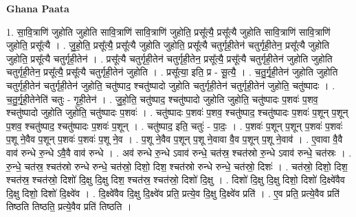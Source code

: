 \documentclass[17pt]{extarticle}
\begin{document}
\textbf{Ghana Paata } \newline

1. सा॒वि॒त्राणि॑ जुहोति जुहोति सावि॒त्राणि॑ सावि॒त्राणि॑ जुहोति॒ प्रसू᳚त्यै॒ प्रसू᳚त्यै जुहोति सावि॒त्राणि॑ सावि॒त्राणि॑ जुहोति॒ प्रसू᳚त्यै । . जु॒हो॒ति॒ प्रसू᳚त्यै॒ प्रसू᳚त्यै जुहोति जुहोति॒ प्रसू᳚त्यै चतुर्गृही॒तेन॑ चतुर्गृही॒तेन॒ प्रसू᳚त्यै जुहोति जुहोति॒ प्रसू᳚त्यै चतुर्गृही॒तेन॑ । . प्रसू᳚त्यै चतुर्गृही॒तेन॑ चतुर्गृही॒तेन॒ प्रसू᳚त्यै॒ प्रसू᳚त्यै चतुर्गृही॒तेन॑ जुहोति जुहोति चतुर्गृही॒तेन॒ प्रसू᳚त्यै॒ प्रसू᳚त्यै चतुर्गृही॒तेन॑ जुहोति । . प्रसू᳚त्या॒ इति॒ प्र - सू॒त्यै॒ । . च॒तु॒र्गृ॒ही॒तेन॑ जुहोति जुहोति चतुर्गृही॒तेन॑ चतुर्गृही॒तेन॑ जुहोति॒ चतु॑ष्पाद॒ श्चतु॑ष्पादो जुहोति चतुर्गृही॒तेन॑ चतुर्गृही॒तेन॑ जुहोति॒ चतु॑ष्पादः । . च॒तु॒र्गृ॒ही॒तेनेति॑ चतुः - गृ॒ही॒तेन॑ । . जु॒हो॒ति॒ चतु॑ष्पाद॒ श्चतु॑ष्पादो जुहोति जुहोति॒ चतु॑ष्पादः प॒शवः॑ प॒शव॒ श्चतु॑ष्पादो जुहोति जुहोति॒ चतु॑ष्पादः प॒शवः॑ । . चतु॑ष्पादः प॒शवः॑ प॒शव॒ श्चतु॑ष्पाद॒ श्चतु॑ष्पादः प॒शवः॑ प॒शून् प॒शून् प॒शव॒ श्चतु॑ष्पाद॒ श्चतु॑ष्पादः प॒शवः॑ प॒शून् । . चतु॑ष्पाद॒ इति॒ चतुः॑ - पा॒दः॒ । . प॒शवः॑ प॒शून् प॒शून् प॒शवः॑ प॒शवः॑ प॒शू ने॒वैव प॒शून् प॒शवः॑ प॒शवः॑ प॒शू ने॒व । . प॒शू ने॒वैव प॒शून् प॒शू ने॒वावा वै॒व प॒शून् प॒शू ने॒वाव॑ । . ए॒वावा वै॒वै वाव॑ रुन्धे रु॒न्धे ऽवै॒वै वाव॑ रुन्धे । . अव॑ रुन्धे रु॒न्धे ऽवाव॑ रुन्धे॒ चत॑स्र॒ श्चत॑स्रो रु॒न्धे ऽवाव॑ रुन्धे॒ चत॑स्रः । . रु॒न्धे॒ चत॑स्र॒ श्चत॑स्रो रुन्धे रुन्धे॒ चत॑स्रो॒ दिशो॒ दिश॒ श्चत॑स्रो रुन्धे रुन्धे॒ चत॑स्रो॒ दिशः॑ । . चत॑स्रो॒ दिशो॒ दिश॒ श्चत॑स्र॒ श्चत॑स्रो॒ दिशो॑ दि॒क्षु दि॒क्षु दिश॒ श्चत॑स्र॒ श्चत॑स्रो॒ दिशो॑ दि॒क्षु । . दिशो॑ दि॒क्षु दि॒क्षु दिशो॒ दिशो॑ दि॒क्ष्वे॑वैव दि॒क्षु दिशो॒ दिशो॑ दि॒क्ष्वे॑व । . दि॒क्ष्वे॑वैव दि॒क्षु दि॒क्ष्वे॑व प्रति॒ प्रत्ये॒व दि॒क्षु दि॒क्ष्वे॑व प्रति॑ । . ए॒व प्रति॒ प्रत्ये॒वैव प्रति॑ तिष्ठति तिष्ठति॒ प्रत्ये॒वैव प्रति॑ तिष्ठति । \newline
\end{document}
